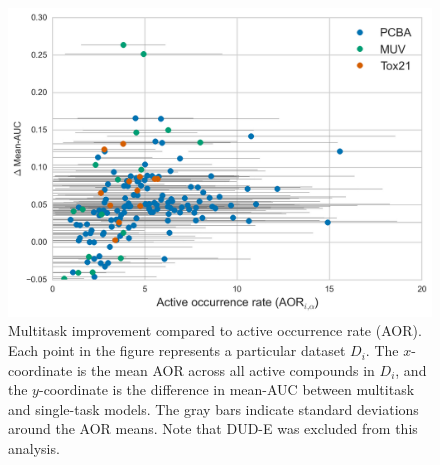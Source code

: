 \begin{figure}[ht]
\centering
\includegraphics[width=0.9\linewidth]{Images/dataset_similarity.png}
\caption{Multitask improvement compared to active occurrence rate (AOR).
  Each point in the figure represents a particular dataset $D_i$. The
  $x$-coordinate is the mean AOR across all active compounds in $D_i$, and
  the $y$-coordinate is the difference in mean-AUC between
  multitask and single-task models. The gray bars indicate standard
  deviations around the AOR means. Note that DUD-E was excluded from this
  analysis.}
\label{fig:dataset_similarity}
\end{figure}

%
%

%